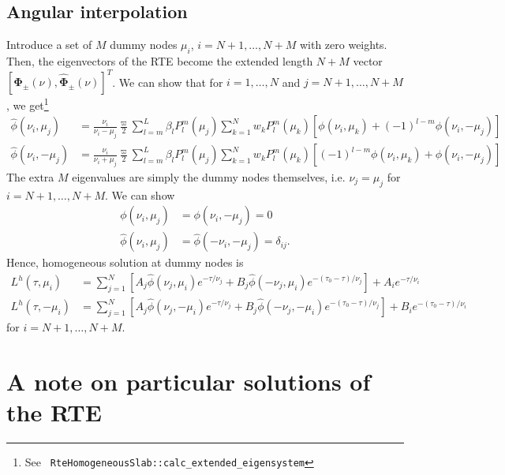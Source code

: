 \documentclass[11pt]{article}
\newcommand{\gvec}[1]{\boldsymbol{#1}}
\begin{document}
\subsection{Angular interpolation}
Introduce a set of $M$ dummy nodes $\mu_i$, $i=N+1,\ldots,N+M$ with
zero weights. Then, the eigenvectors of the RTE become the extended
length $N+M$ vector $[\gvec{\Phi}_\pm(\nu),
\hat{\gvec{\Phi}}_\pm(\nu)]^T$. We can show that for $i=1,\ldots,N$
and $j=N+1,\ldots,N+M$, we get\footnote{See {\tt
    RteHomogeneousSlab::calc\_extended\_eigensystem}}
\begin{align}
  \hat{\phi}(\nu_i,\mu_j) &= \frac{\nu_i}{\nu_i-\mu_j} \frac{\varpi}{2}
  \sum_{l=m}^L \beta_l P_l^m(\mu_j) \sum_{k=1}^N
  w_k P_l^m(\mu_k)
  \left[
    \phi(\nu_i,\mu_k) + (-1)^{l-m}\phi(\nu_i,-\mu_j)
  \right] \\
  \hat{\phi}(\nu_i,-\mu_j) &= \frac{\nu_i}{\nu_i+\mu_j} \frac{\varpi}{2}
  \sum_{l=m}^L \beta_l P_l^m(\mu_j) \sum_{k=1}^N
  w_k P_l^m(\mu_k)
  \left[
    (-1)^{l-m} \phi(\nu_i,\mu_k) + \phi(\nu_i,-\mu_j)
  \right]
\end{align}
The extra $M$ eigenvalues are simply the dummy nodes themselves,
i.e. $\nu_j = \mu_j$ for $i=N+1,\ldots,N+M$. We can show
\begin{align}
  \phi(\nu_i,\mu_j) &= \phi(\nu_i,-\mu_j) = 0 \\
  \hat{\phi}(\nu_i,\mu_j) &= \hat{\phi}(-\nu_i,-\mu_j) = \delta_{ij}.
\end{align}
Hence, homogeneous solution at dummy nodes is
\begin{align}
  L^h(\tau,\mu_i) &= \sum_{j=1}^N
  \left[
    A_j \hat{\phi}(\nu_j, \mu_i) e^{-\tau/\nu_j} +
    B_j \hat{\phi}(-\nu_j, \mu_i) e^{-(\tau_0-\tau)/\nu_j}
  \right]
  + A_i e^{-\tau/\nu_i} \\
  L^h(\tau,-\mu_i) &= \sum_{j=1}^N
  \left[
    A_j \hat{\phi}(\nu_j, -\mu_i) e^{-\tau/\nu_j} +
    B_j \hat{\phi}(-\nu_j, -\mu_i) e^{-(\tau_0-\tau)/\nu_j}
  \right]
  + B_i e^{-(\tau_0-\tau)/\nu_i}
\end{align}
for $i=N+1,\ldots,N+M$.

\appendix

\section{A note on particular solutions of the RTE}
\end{document}
